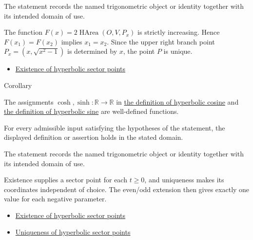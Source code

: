 \begin{remark*}[Interpretation]
The statement records the named trigonometric object or identity together with
its intended domain of use.
\end{remark*}

\begin{remark*}[Proof]
The function $F(x)=2\operatorname{HArea}(O,V,P_x)$ is strictly increasing.
Hence $F(x_1)=F(x_2)$ implies $x_1=x_2$. Since the upper right branch point
$P_x=(x,\sqrt{x^2-1})$ is determined by $x$, the point $P$ is unique.
\end{remark*}
\begin{dependencies}
\begin{itemize}
  \item \hyperref[thm:hyperbolic-sector-existence]{Existence of hyperbolic sector points}
\end{itemize}
\end{dependencies}

\begin{corollarybox}{Corollary}
\begin{corollary}
\label{cor:hyperbolic-sine-cosine-well-defined}
The assignments $\cosh,\sinh:\mathbb{R}\to\mathbb{R}$ in
\hyperref[def:hyperbolic-cosine]{the definition of hyperbolic cosine} and
\hyperref[def:hyperbolic-sine]{the definition of hyperbolic sine} are
well-defined functions.
\end{corollary}
\end{corollarybox}
\begin{remark*}
For every admissible input satisfying the hypotheses of the statement, the
displayed definition or assertion holds in the stated domain.
\end{remark*}

\begin{remark*}[Interpretation]
The statement records the named trigonometric object or identity together with
its intended domain of use.
\end{remark*}

\begin{remark*}[Proof]
Existence supplies a sector point for each $t\geq 0$, and uniqueness makes its
coordinates independent of choice. The even/odd extension then gives exactly
one value for each negative parameter.
\end{remark*}
\begin{dependencies}
\begin{itemize}
  \item \hyperref[thm:hyperbolic-sector-existence]{Existence of hyperbolic sector points}
  \item \hyperref[thm:hyperbolic-sector-uniqueness]{Uniqueness of hyperbolic sector points}
\end{itemize}
\end{dependencies}

